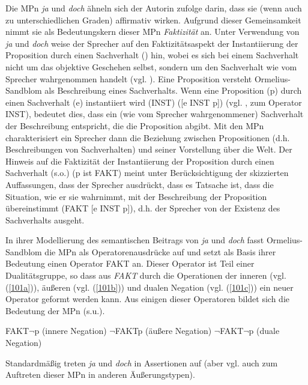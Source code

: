 Die MPn \textit{ja} und \textit{doch} ähneln sich der Autorin zufolge darin, dass sie (wenn auch zu unterschiedlichen Graden) affirmativ wirken. Aufgrund dieser Gemeinsamkeit nimmt sie als Bedeutungskern dieser MPn \textit{Faktizität}  an. Unter Verwendung von \textit{ja} und \textit{doch} weise der Sprecher auf den \glqq Faktizitätsaspekt\grqq{} der Instantiierung der Proposition durch einen Sachverhalt (\citeyear[80]{Ormelius-Sandblom1997}) hin, wobei es sich bei einem Sachverhalt nicht um das objektive Geschehen selbst, sondern um den Sachverhalt wie vom Sprecher wahrgenommen handelt (vgl. \citealt[99]{Rehbock1992}). Eine Proposition versteht Ormelius-Sandblom als Beschreibung eines Sachverhalts. Wenn eine Proposition (p) durch einen Sachverhalt (e) instantiiert wird (INST) ([e INST p]) (vgl. \citealt[23]{Bierwisch1988}, \citealt[35-36]{Brandt1992b} zum Operator INST), bedeutet dies, dass ein (wie vom Sprecher wahrgenommener) Sachverhalt der Beschreibung entspricht, die die Proposition abgibt. Mit den MPn charakterisiert ein Sprecher dann die Beziehung zwischen Propositionen (d.h. Beschreibungen von Sachverhalten) und seiner Vorstellung über die Welt. Der Hinweis auf die Faktizität der Instantiierung der Proposition durch einen Sachverhalt (s.o.) (\glq p ist FAKT\grq {}) meint unter Berücksichtigung der skizzierten Auffassungen, dass der Sprecher ausdrückt, dass es Tatsache ist, dass die Situation, wie er sie wahrnimmt, mit der Beschreibung der Proposition übereinstimmt (FAKT [e INST p]), d.h. der Sprecher von der Existenz des Sachverhalts ausgeht.

In ihrer Modellierung des semantischen Beitrags von \textit{ja} und \textit{doch} fasst Ormelius-Sandblom die MPn als Operatorenausdrücke auf und setzt als Basis ihrer Bedeutung einen Operator  FAKT an. Dieser Operator ist Teil einer Dualitätsgruppe, so dass aus \textit{FAKT} durch die Operationen der inneren (vgl. (\ref{101a})), äußeren (vgl. (\ref{101b})) und dualen Negation (vgl. (\ref{101c})) ein neuer Operator geformt werden kann. Aus einigen dieser Operatoren bildet sich die Bedeutung der MPn (s.u.).

\begin{exe}
	\ex\label{101} 
		\begin{xlist}	
			\ex\label{101a} FAKT$\neg$p (innere Negation)
			\ex\label{101b} $\neg$FAKTp (äußere Negation)
			\ex\label{101c} $\neg$FAKT$\neg$p (duale Negation)
		\end{xlist}
\end{exe}
Standardmäßig treten \textit{ja} und \textit{doch} in Assertionen auf (aber vgl. \citealt[87-92]{Ormelius-Sandblom1997} auch zum Auftreten dieser MPn in anderen Äußerungstypen). 


